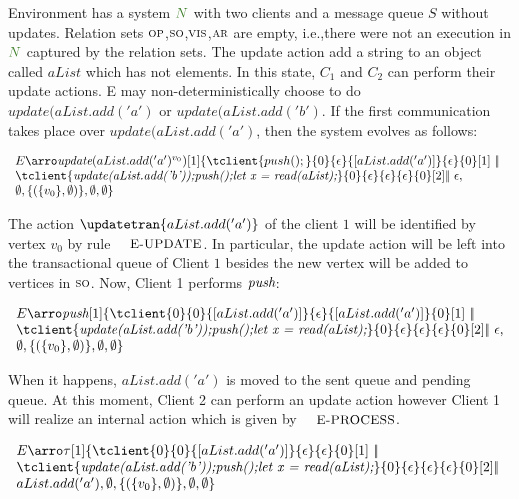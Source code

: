 \documentclass[envcountsect,runningheads,orivec]{llncs}
\begin{document}
Environment has a system $\systemterm$ with two clients and a message queue $S$ without updates. Relation sets $\textsc{\scriptsize{OP}}$,$\textsc{\scriptsize{SO}}$,$\textsc{\scriptsize{VIS}}$,$\textsc{\scriptsize{AR}}$ are empty, i.e.,there were not an execution in $\systemterm$ captured by the relation sets. The update action add a string to an object called $aList$ which has not elements. 
In this state, $C_1$ and $C_2$ can perform their update actions. E may non-deterministically choose to do $update(aList.add('a')$ or $update(aList.add('b')$. If the first communication takes place over $update(aList.add('a')$, then the system evolves as follows:

\[
\begin{array}{l}
E \arrobyclient{\updatevtran{aList.add('a')}{{v_0}}}{1} \environment{\tclient{push();}{0}{\epsilon}{[aList.add('a')]}{\epsilon}{0}[1]\ \bigpar\
\\
\tclient{\textit{update(aList.add('b'));push();let x = read(aList);}}{0}{\epsilon}{\epsilon}{\epsilon}{0}[2]  \bigpar\ \epsilon} 
{\\ \emptyset}{\{( \{ v_0 \} , \emptyset ) \}}{\emptyset}{\emptyset} 
\end{array}
\]

The action $\updatetran{aList.add('a')}$ of the client $1$ will be identified by vertex $v_0$ by rule $\textsc{\small{E-UPDATE}}$. In particular, the update action will be left into the transactional queue of Client $1$ besides the new vertex will be added to vertices in $\textsc{\scriptsize{SO}}$. Now, Client 1 performs $\textit{push}$: 

\[
\begin{array}{l}
E \arrobyclient{\pushtran}{1} \environment{\tclient{0}{0}{[aList.add('a')]}{\epsilon}{[aList.add('a')]}{0}[1]\ \bigpar\
\\
\tclient{\textit{update(aList.add('b'));push();let x = read(aList);}}{0}{\epsilon}{\epsilon}{\epsilon}{0}[2]  \bigpar\ \epsilon} 
{\\ \emptyset}{\{( \{ v_0 \} , \emptyset ) \}}{\emptyset}{\emptyset} 
\end{array}
\]
		
When it happens, $aList.add('a')$ is moved to the sent queue and pending queue. At this moment, Client 2 can perform an update action however Client 1 will realize an internal action which is given by $\textsc{\small{E-PROCESS}}$.  			

\[
\begin{array}{l}
E \arrobyclient{\tau}{1} \environment{\tclient{0}{0}{[aList.add('a')]}{\epsilon}{\epsilon}{0}[1]\ \bigpar\ \\
\tclient{\textit{update(aList.add('b'));push();let x = read(aList);}}{0}{\epsilon}{\epsilon}{\epsilon}{0}[2]  \bigpar\ \\ 
aList.add('a')} 
{\emptyset}{\{( \{ v_0 \} , \emptyset ) \}}{\emptyset}{\emptyset} 
\end{array}
\]
\end{document}

